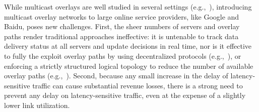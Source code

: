 While multicast overlays are well studied in several settings
(e.g.,~\cite{??,??,??,??}), introducing multicast overlay networks 
to large online  service providers, 
like Google and Baidu, poses new challenges.
First, the sheer numbers of servers and overlay paths render 
traditional approaches ineffective: it is untenable 
to track data delivery status at all servers and update 
decisions in real time, nor is it effective to fully the exploit 
overlay paths by using decentralized protocols
(e.g.,~\cite{??,??}), 
or enforcing a strictly structured logical topology to reduce 
the number of available overlay paths (e.g.,~\cite{akamai}).
Second, because any small increase in the delay of
latency-sensitive traffic can cause substantial revenue losses, 
there is a strong need to prevent any delay on
latency-sensitive traffic, even at the expense of a 
slightly lower link utilization.




